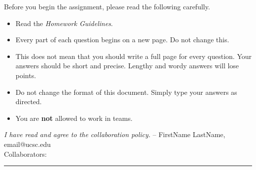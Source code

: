 \documentclass[11pt]{article}
\begin{document}
\renewcommand{\P}{\mbox{IH}}
Before you begin the assignment, please read the following carefully.
\begin{itemize}
    \item Read the \emph{Homework Guidelines}.
    \item Every part of each question begins on a new page. Do not change this.
    \item This does not mean that you should write a full page for every question. Your answers should be short and precise. Lengthy and wordy answers will lose points.
    \item Do not change the format of this document. Simply type your answers as directed.
    \item You are \textbf{not} allowed to work in teams.
\end{itemize}
\emph{I have read and agree to the collaboration policy.}  -- FirstName LastName, email@ucsc.edu
\\
Collaborators: %
\\
\hrule
\end{document}
